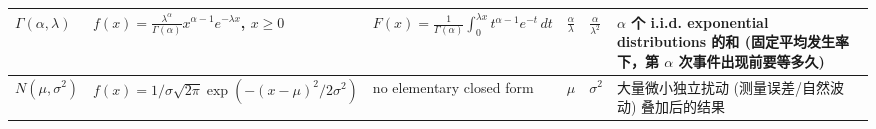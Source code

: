\begin{center}
\begin{tabular}{|p{1.9cm}|p{2.8cm}|p{4.2cm}|p{1.2cm}|p{1.2cm}|p{4cm}|}
\hline
$\Gamma(\alpha,\lambda)$ &
$f(x)=\frac{\lambda^\alpha}{\Gamma(\alpha)}x^{\alpha-1}e^{-\lambda x}$, $x\ge 0$ &
$F(x)=\frac{1}{\Gamma(\alpha)}\int_{0}^{\lambda x} t^{\alpha-1}e^{-t}\,dt$ &
$\frac{\alpha}{\lambda}$ &
$\frac{\alpha}{\lambda^2}$ &
$\alpha$ 个 i.i.d. exponential distributions 的和 (固定平均发生率下，第 $\alpha$ 次事件出现前要等多久)\\
\hline
$N(\mu,\sigma^2)$ &
$f(x)=1/\sigma\sqrt{2\pi}\exp(-(x-\mu)^2/2\sigma^2)$ &
no elementary closed form&
$\mu$ &
$\sigma^2$ &
大量微小独立扰动 (测量误差/自然波动) 叠加后的结果\\
\hline
\end{tabular}
\end{center}









